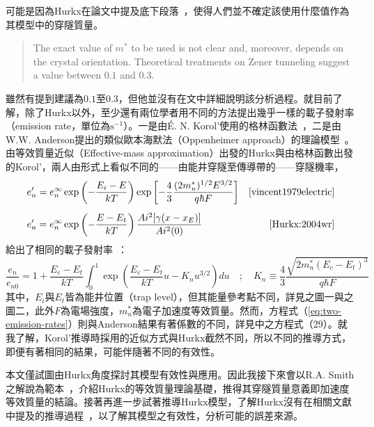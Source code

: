 可能是因為Hurkx在論文中提及底下段落~\cite{hurkx1989modelling}，使得人們並不確定該使用什麼值作為其模型中的穿隧質量。
\begin{quote}
The exact value of $m^*$ to be used is not clear and, moreover, depends on the crystal orientation. Theoretical treatments on Zener tunneling suggest a value between $0.1$ and $0.3$.
\end{quote}
雖然有提到建議為$0.1$至$0.3$，但他並沒有在文中詳細說明該分析過程。就目前了解，除了Hurkx以外，至少還有兩位學者用不同的方法提出幾乎一樣的載子發射率（emission rate，單位為$\mathrm{s}^{-1}$）。一是由É. N. Korol'使用的格林函數法~\cite{korol1977ionization}，二是由W.W. Anderson提出的類似歐本海默法（Oppenheimer approach）的理論模型~\cite{anderson1982field}。由等效質量近似（Effective-mass approximation）出發的Hurkx與由格林函數出發的Korol'，兩人由形式上看似不同的——由能井穿隧至傳導帶的——穿隧機率，
\begin{equation}
\begin{aligned}
\label{eq:two-emission-rates}
e_n^\prime&=e_n^\infty \exp\left(-\frac{E_i-E}{kT}\right)\exp\left[-\frac{4}{3}\frac{(2m_n^*)^{1/2}E^{3/2}}{q\hbar F}\right]&\cite{vincent1979electric}\\[5pt]
e_n^\prime&=e_{n}^{\infty}\exp\left(-\frac{E-E_t}{kT}\right)\frac{Ai^2[\gamma(x-x_E)]}{Ai^2(0)}&\cite{Hurkx:2004wr}
\end{aligned}
\end{equation}
給出了相同的載子發射率~\cite{vincent1979electric}\cite{lui1997new}：
\begin{equation}
\frac{e_n}{e_{n0}}=1+\frac{E_c-E_t}{kT}\int_0^1\exp\left(\frac{E_c-E_t}{kT}u-K_nu^{3/2}\right)du\quad;\quad K_n\equiv \frac{4}{3}\frac{\sqrt{2m^*_n(E_c-E_t)^3}}{q\hbar F}
\end{equation}
其中，$E_i$與$E_t$皆為能井位置（trap level），但其能量參考點不同，詳見\cite{vincent1979electric}之圖一與\cite{Hurkx:2004wr}之圖二，此外$F$為電場強度，$m^*_n$為電子加速度等效質量。然而，方程式（\ref{eq:two-emission-rates}）則與Anderson結果有著係數的不同，詳見\cite{anderson1982field}中之方程式（29）。就我了解，Korol'推導時採用的近似方式與Hurkx截然不同，所以不同的推導方式，即便有著相同的結果，可能伴隨著不同的有效性。

本文僅試圖由Hurkx角度探討其模型有效性與應用。因此我接下來會以R.A. Smith之解說為範本~\cite{smith1963wavech11}，介紹Hurkx的等效質量理論基礎，推得其穿隧質量意義即加速度等效質量的結論。接著再進一步試著推導Hurkx模型，了解Hurkx沒有在相關文獻中提及的推導過程~\cite{hurkx1989modelling}\cite{hurkx1992new}\cite{Hurkx:1998wn}\cite{Hurkx:2004wr}，以了解其模型之有效性，分析可能的誤差來源。
